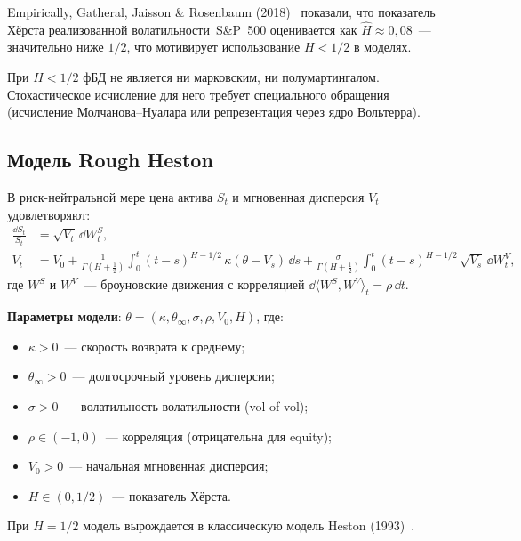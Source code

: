 Empirically, Gatheral, Jaisson \& Rosenbaum (2018)~\cite{Gatheral2018}
показали, что показатель Хёрста реализованной волатильности~S\&P~500
оценивается как $\hat{H} \approx 0{,}08$~--- значительно ниже $1/2$,
что мотивирует использование $H < 1/2$ в моделях.

\begin{remark}
  При $H < 1/2$ фБД не является ни марковским, ни полумартингалом.
  Стохастическое исчисление для него требует специального обращения
  (исчисление Молчанова--Нуалара или репрезентация через ядро Вольтерра).
\end{remark}

\subsection{Модель Rough Heston}

\begin{definition}
  В риск-нейтральной мере цена актива $S_t$ и мгновенная дисперсия $V_t$
  удовлетворяют:
  \begin{align}
    \frac{\dd S_t}{S_t}
      &= \sqrt{V_t}\,\dd W_t^S, \label{eq:S_dyn}\\
    V_t
      &= V_0 + \frac{1}{\Gamma(H+\tfrac{1}{2})}
         \int_0^t (t-s)^{H-1/2}\,\kappa(\theta - V_s)\,\dd s
         + \frac{\sigma}{\Gamma(H+\tfrac{1}{2})}
           \int_0^t (t-s)^{H-1/2}\,\sqrt{V_s}\,\dd W_t^V,
         \label{eq:V_dyn}
  \end{align}
  где $W^S$ и $W^V$~--- броуновские движения с корреляцией
  $\dd\langle W^S, W^V\rangle_t = \rho\,\dd t$.
\end{definition}

\textbf{Параметры модели}: $\theta = (\kappa, \theta_{\infty}, \sigma, \rho, V_0, H)$,
где:
\begin{itemize}
  \item $\kappa > 0$~--- скорость возврата к среднему;
  \item $\theta_{\infty} > 0$~--- долгосрочный уровень дисперсии;
  \item $\sigma > 0$~--- волатильность волатильности (vol-of-vol);
  \item $\rho \in (-1, 0)$~--- корреляция (отрицательна для equity);
  \item $V_0 > 0$~--- начальная мгновенная дисперсия;
  \item $H \in (0, 1/2)$~--- показатель Хёрста.
\end{itemize}

При $H = 1/2$ модель вырождается в классическую модель Heston (1993)~\cite{Heston1993}.

